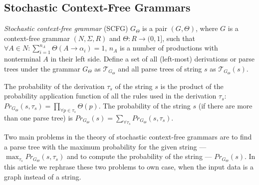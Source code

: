 \documentclass[sigconf, 10pt]{acmart}
\begin{document}
\subsection{Stochastic Context-Free Grammars}

\emph{Stochastic context-free grammar} (SCFG) $G_\Theta$ is a pair $(G, \Theta)$, where $G$ is a context-free grammar $(N, \Sigma, R)$ and $\Theta: R \rightarrow (0, 1]$, such that $\forall A \in N : \sum_{i=1}^{n_A} \Theta(A \rightarrow \alpha_i) = 1$, $n_A$ is a number of productions with nonterminal $A$ in their left side.
Define a set of all (left-most) derivations or parse trees under the grammar $G_\Theta$ as $\mathcal{T}_{G_\Theta}$ and all parse trees of string $s$ as $\mathcal{T}_{G_\Theta}(s)$.

The probability of the derivation $\tau_s$ of the string $s$ is the product of the probability application function of all the rules used in the derivation $\tau_s$: $Pr_{G_\Theta}(s, \tau_s) = \prod_{\forall p \in \tau_s} \Theta(p)$. The probability of the string $s$ (if there are more than one parse tree) is $Pr_{G_\Theta}(s) = \sum_{\forall \tau_s}Pr_{G_\Theta}(s, \tau_s)$.

Two main problems in the theory of stochastic context-free grammars are to find a parse tree with the maximum probability for the given string --- $ \max_{\tau_s} Pr_{G_\Theta}(s, \tau_s)$ and to compute the probability of the string --- $Pr_{G_\Theta}(s)$. In this article we rephrase these two problems to own case, when the input data is a graph instead of a string.



\end{document}
